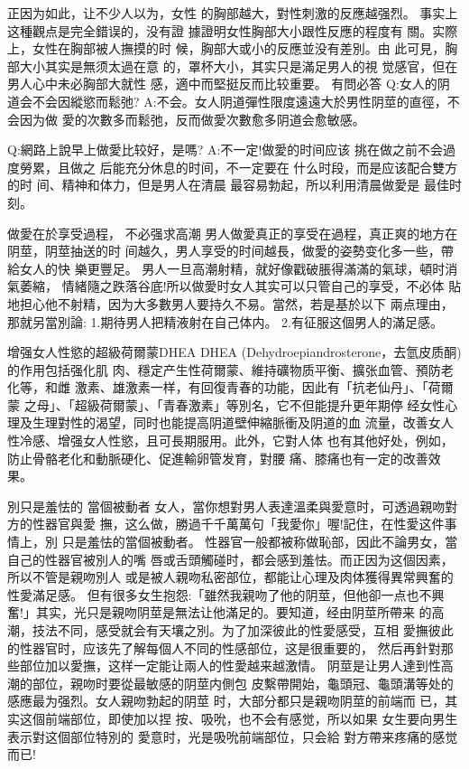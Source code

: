 \documentclass[12pt,UTF8]{ctexbook}
\begin{document}
正因为如此，让不少人以为，女性
的胸部越大，對性刺激的反應越强烈。
事实上这種觀点是完全錯误的，没有證
據證明女性胸部大小跟性反應的程度有
關。实際上，女性在胸部被人撫摸的时
候，胸部大或小的反應並没有差別。由
此可見，胸部大小其实是無须太過在意
的，罩杯大小，其实只是滿足男人的視
觉感官，但在男人心中未必胸部大就性
感，適中而堅挺反而比较重要。
有問必答
Q:女人的阴道会不会因縱慾而鬆弛?
A:不会。女人阴道彈性限度遠遠大於男性阴莖的直徑，不会因为做
愛的次數多而鬆弛，反而做愛次數愈多阴道会愈敏感。

Q:網路上說早上做愛比较好，是嗎?
A:不一定!做愛的时间应该
挑在做之前不会過度勞累，且做之
后能充分休息的时间，不一定要在
什么时段，而是应该配合雙方的时
间、精神和体力，但是男人在清晨
最容易勃起，所以利用清晨做愛是
最佳时刻。

做愛在於享受過程，
不必强求高潮
男人做愛真正的享受在過程，真正爽的地方在阴莖，阴莖抽送的时
间越久，男人享受的时间越長，做愛的姿勢变化多一些，帶給女人的快
樂更豐足。
男人一旦高潮射精，就好像戳破脹得滿滿的氣球，頓时消氣萎縮，
情緒隨之跌落谷底!所以做愛时女人其实可以只管自己的享受，不必体
貼地担心他不射精，因为大多數男人要持久不易。當然，若是基於以下
兩点理由，那就另當別論:
1.期待男人把精液射在自己体内。
2.有征服这個男人的滿足感。

增强女人性慾的超級荷爾蒙DHEA
DHEA (Dehydroepiandrosterone，去氫皮质酮)的作用包括强化肌
肉、穩定产生性荷爾蒙、維持礦物质平衡、擴张血管、預防老化等，和雌
激素、雄激素一样，有回復青春的功能，因此有「抗老仙丹」、「荷爾蒙
之母」、「超級荷爾蒙」、「青春激素」等別名，它不但能提升更年期停
经女性心理及生理對性的渴望，同时也能提高阴道壁伸縮脈衝及阴道的血
流量，改善女人性冷感、增强女人性慾，且可長期服用。此外，它對人体
也有其他好处，例如，防止骨骼老化和動脈硬化、促進輸卵管发育，對腰
痛、膝痛也有一定的改善效果。

別只是羞怯的
當個被動者
女人，當你想對男人表達溫柔與愛意时，可透過親吻對方的性器官與愛
撫，这么做，勝過千千萬萬句「我愛你」喔!記住，在性愛这件事情上，別
只是羞怯的當個被動者。
性器官一般都被称做恥部，因此不論男女，當自己的性器官被別人的嘴
唇或舌頭觸碰时，都会感到羞怯。而正因为这個因素，所以不管是親吻別人
或是被人親吻私密部位，都能让心理及肉体獲得異常興奮的性愛滿足感。
但有很多女生抱怨:「雖然我親吻了他的阴莖，但他卻一点也不興
奮!」其实，光只是親吻阴莖是無法让他滿足的。要知道，经由阴莖所帶来
的高潮，技法不同，感受就会有天壤之別。为了加深彼此的性愛感受，互相
愛撫彼此的性器官时，应该先了解每個人不同的性感部位，这是很重要的，
然后再針對那些部位加以愛撫，这样一定能让兩人的性愛越来越激情。
阴莖是让男人達到性高潮的部位，親吻时要從最敏感的阴莖内側包
皮繫帶開始，龜頭冠、龜頭溝等处的
感應最为强烈。女人親吻勃起的阴莖
时，大部分都只是親吻阴莖的前端而
已，其实这個前端部位，即使加以捏
按、吸吮，也不会有感觉，所以如果
女生要向男生表示對这個部位特別的
愛意时，光是吸吮前端部位，只会給
對方帶来疼痛的感觉而已!
\end{document}
